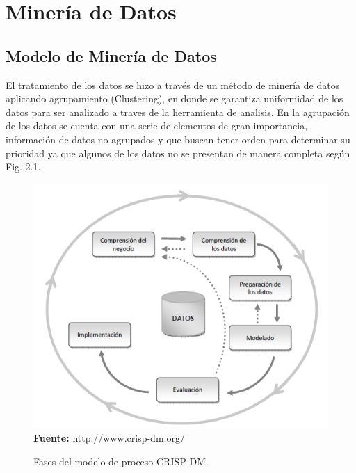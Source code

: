 \documentclass[a4paper,openright,12pt]{book}
\theoremstyle{definition}
\theoremstyle{remark}
\begin{document}
\section{Minería de Datos}

\subsection{Modelo de Minería de Datos}

El tratamiento de los datos se hizo a través de un método de minería de datos aplicando agrupamiento (Clustering), en donde se garantiza uniformidad de los datos para ser analizado a traves de la herramienta de analisis. En la agrupación de los datos se cuenta con una serie de elementos de gran importancia, información de datos no agrupados y que buscan tener orden  para determinar su prioridad ya que algunos de los datos no se presentan de manera completa según Fig. 2.1.

\begin{figure}[ht]
\centering
\caption{Fases del modelo de proceso CRISP-DM.} 
\includegraphics[scale=0.50]{CRIPS}
\\\textbf{Fuente:} http://www.crisp-dm.org/
\label{fig:Ubicacion}
\end{figure}
\end{document}
